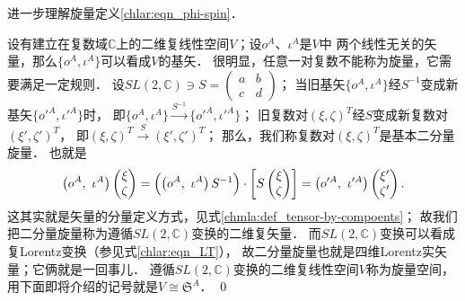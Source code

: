 
\begin{example}
    进一步理解旋量定义\eqref{chlar:eqn_phi-spin}．
\end{example}

设有建立在复数域$\mathbb{C}$上的二维复线性空间$V$；设$o^A$、$\iota^A$是$V$中
两个线性无关的矢量，那么$\{o^A,\iota^A\}$可以看成$V$的基矢．
很明显，任意一对复数不能称为旋量，它需要满足一定规则．
设$SL(2,\mathbb{C}) \ni S = \left(\begin{smallmatrix} a & b\\ c & d \end{smallmatrix}\right)$；
当旧基矢$\{o^A,\iota^A\}$经$S^{-1}$变成新基矢$\{o'^A,\iota'^A\}$时，
即$\{o^A,\iota^A\}\overset{S^{-1}}{\rightarrow}\{o'^A,\iota'^A\}$；
旧复数对$(\xi,\zeta)^T$经$S$变成新复数对$(\xi',\zeta')^T$，
即$(\xi,\zeta)^T \overset{S}{\rightarrow} (\xi',\zeta')^T$；
那么，我们称复数对$(\xi,\zeta)^T$是基本二分量旋量．
也就是
\begin{equation}
    \left(o^A,\ \iota^A\right) \begin{pmatrix} \xi \\\zeta \end{pmatrix}
    =\Bigl(\left(o^A,\ \iota^A\right) S^{-1}\Bigr) \cdot 
    \left[S \begin{pmatrix} \xi \\\zeta \end{pmatrix}\right]
    =\left(o'^A,\ \iota'^A\right) \begin{pmatrix} \xi' \\\zeta' \end{pmatrix} .
\end{equation}
这其实就是矢量的分量定义方式，见式\eqref{chmla:def_tensor-by-compoents}；
故我们把二分量旋量称为遵循$SL(2,\mathbb{C})$变换的二维复矢量．
而$SL(2,\mathbb{C})$变换可以看成复Lorentz变换（参见式\eqref{chlar:eqn_LT}），
故二分量旋量也就是四维Lorentz实矢量；它俩就是一回事儿．
遵循$SL(2,\mathbb{C})$变换的二维复线性空间$V$称为旋量空间，
用下面即将介绍的记号就是$V\cong \mathfrak{S}^A$． \qed



